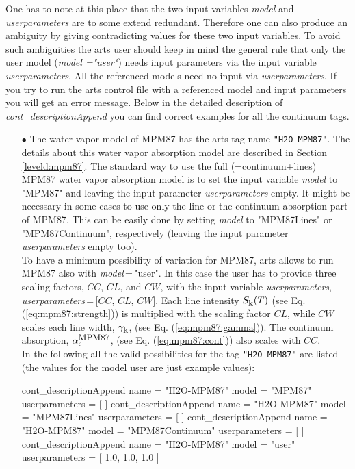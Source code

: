 One has to note at this place that the two input variables {\it model} and
{\it userparameters} are to some extend redundant. Therefore one can also 
produce an ambiguity by giving contradicting values for these two input variables.
To avoid such ambiguities the arts user should keep in mind the general 
rule that only the user model ({\it model ="user"}) needs input parameters 
via the input variable {\it userparameters}. All the referenced models 
need no input via {\it userparameters}. If you try to run the arts control 
file with a referenced model and input parameters you will get an error message.
Below in the detailed description of {\it cont\_descriptionAppend} you 
can find correct examples for all the continuum tags.

\begin{itemize}
\item[$\bullet$] The water vapor model of MPM87 \citep{liebeandlayton:87} 
     has the arts tag name {\tt "H2O-MPM87"}. The details about this water 
     vapor absorption model are described in Section \ref{leveld:mpm87}. 
     The standard way to use the full (=continuum+lines) MPM87 water 
     vapor absorption model is to set the input variable {\it model} 
     to "MPM87" and leaving the input parameter {\it userparameters} empty. 
     It might be necessary in some cases to use only the line or the 
     continuum absorption part of MPM87. This can be easily done 
     by setting {\it model} to "MPM87Lines" or "MPM87Continuum", 
     respectively (leaving the input parameter {\it userparameters} 
     empty too).\\ To have a minimum possibility of variation for MPM87, 
     arts allows to run MPM87 also with {\it model}\,=\,"user". 
     In this case the user has to provide three scaling factors,  
     $CC$, $CL$, and $CW$, with the input variable {\it userparameters}, 
     {\it userparameters}\,=\,$[$$CC$, $CL$, $CW$$]$. 
     Each line intensity $S_{\mbox{\rm \small k}}(T)$ (see Eq. (\ref{eq:mpm87:strength})) 
     is multiplied with the scaling factor $CL$, while $CW$ scales 
     each line width, $\gamma_{\mbox{\rm \small k}}$, (see Eq. (\ref{eq:mpm87:gamma})). 
     The continuum absorption, $\alpha^{\mbox{\rm \small MPM87}}_{\rm c}$, 
     (see Eq. (\ref{eq:mpm87:cont})) also scales with $CC$.\\
     In the following all the valid possibilities for the
     tag {\tt "H2O-MPM87"} are listed (the values for the 
     model user are just example values): 
\begin{code}
cont_descriptionAppend{
    name           = "H2O-MPM87"
    model          = "MPM87"
    userparameters = [ ]
}
cont_descriptionAppend{
    name           = "H2O-MPM87"
    model          = "MPM87Lines"
    userparameters = [ ]
}
cont_descriptionAppend{
    name           = "H2O-MPM87"
    model          = "MPM87Continuum"
    userparameters = [ ]
}
cont_descriptionAppend{
    name           = "H2O-MPM87"
    model          = "user"
    userparameters = [ 1.0, 1.0, 1.0 ]
}
\end{code}


\end{itemize}
